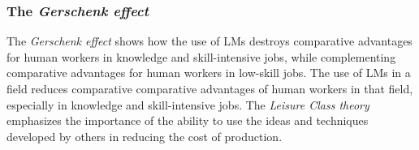 \documentclass{article} %
\begin{document}
\subsubsection{The \emph{Gerschenk effect}}

The \emph{Gerschenk effect} shows how the use of LMs destroys comparative advantages for human workers in knowledge and skill-intensive jobs, while complementing comparative advantages for human workers in low-skill jobs.
The use of LMs in a field reduces comparative comparative advantages of human workers in that field, especially in knowledge and skill-intensive jobs.
The \emph{Leisure Class theory} emphasizes the importance of the ability to use the ideas and techniques developed by others in reducing the cost of production.



\end{document}
